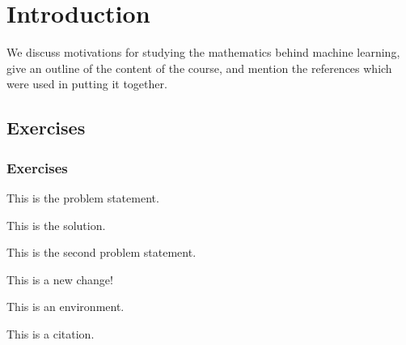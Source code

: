 \chapter{Introduction}

\begin{chout}
	We discuss motivations for studying the mathematics behind machine learning, give an outline of the content of the course, and mention the references which were used in putting it together.
\end{chout}

\section{Exercises}
\subsection{Exercises \basic}
\begin{exercise}
	\begin{problem}
	This is the problem statement.
	\end{problem}
	\begin{solution}
		This is the solution.
	\end{solution}
\end{exercise}

\begin{exercise}
	\begin{problem}
	This is the second problem statement.
	\end{problem}
	\begin{solution}
		This is a new change!
	\end{solution}
\end{exercise}

\begin{notation}
	This is an environment.
\end{notation}

This is a citation\cite{donaldson}.
